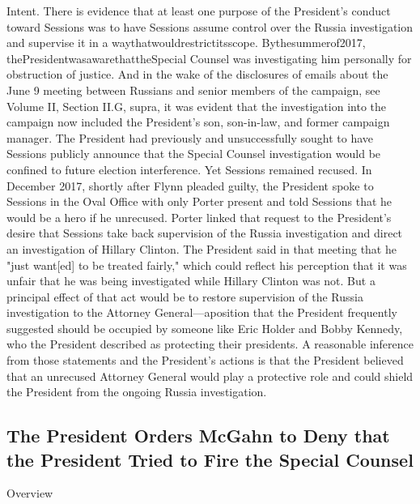 Intent.
There is evidence that at least one purpose of the President's conduct toward Sessions was to have Sessions assume control over the Russia investigation and supervise it in a waythatwouldrestrictitsscope.
Bythesummerof2017, thePresidentwasawarethattheSpecial Counsel was investigating him personally for obstruction of justice.
And in the wake of the disclosures of emails about the June 9 meeting between Russians and senior members of the campaign, see Volume II, Section II.G, supra, it was evident that the investigation into the campaign now included the President's son, son-in-law, and former campaign manager.
The President had previously and unsuccessfully sought to have Sessions publicly announce that the Special Counsel investigation would be confined to future election interference.
Yet Sessions remained recused.
In December 2017, shortly after Flynn pleaded guilty, the President spoke to Sessions in the Oval Office with only Porter present and told Sessions that he would be a hero if he unrecused.
Porter linked that request to the President's desire that Sessions take back supervision of the Russia investigation and direct an investigation of Hillary Clinton.
The President said in that meeting that he "just want[ed] to be treated fairly," which could reflect his perception that it was unfair that he was being investigated while Hillary Clinton was not.
But a principal effect of that act would be to restore supervision of the Russia investigation to the
Attorney General—aposition that the President frequently suggested should be occupied by someone like Eric Holder and Bobby Kennedy, who the President described as protecting their presidents.
A reasonable inference from those statements and the President's actions is that the President believed that an unrecused Attorney General would play a protective role and could shield the President from the ongoing Russia investigation.

\subsection{The President Orders McGahn to Deny that the President Tried to Fire the Special Counsel}

Overview

